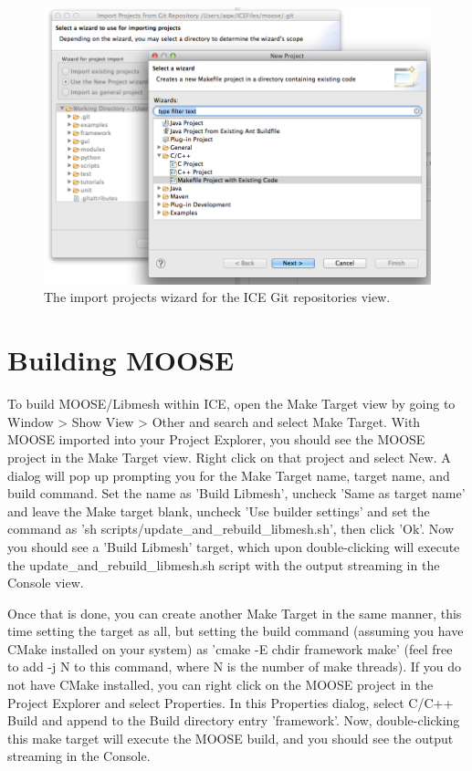 \begin{figure}[htbp]
\centering
\includegraphics[width=\textwidth]{figures/import_git_proj.png}
\caption{The import projects wizard for the ICE Git repositories view. }
\end{figure}

\section{Building MOOSE}\label{building-moose}

To build MOOSE/Libmesh within ICE, open the Make Target view by going to
Window \textgreater{} Show View \textgreater{} Other and search and
select Make Target. With MOOSE imported into your Project Explorer, you
should see the MOOSE project in the Make Target view. Right click on
that project and select New. A dialog will pop up prompting you for the
Make Target name, target name, and build command. Set the name as 'Build
Libmesh', uncheck 'Same as target name' and leave the Make target blank,
uncheck 'Use builder settings' and set the command as 'sh
scripts/update\_and\_rebuild\_libmesh.sh', then click 'Ok'. Now you
should see a 'Build Libmesh' target, which upon double-clicking will
execute the update\_and\_rebuild\_libmesh.sh script with the output
streaming in the Console view.

Once that is done, you can create another Make Target in the same
manner, this time setting the target as all, but setting the build
command (assuming you have CMake installed on your system) as 'cmake -E
chdir framework make' (feel free to add -j N to this command, where N is
the number of make threads). If you do not have CMake installed, you can
right click on the MOOSE project in the Project Explorer and select
Properties. In this Properties dialog, select C/C++ Build and append to
the Build directory entry 'framework'. Now, double-clicking this make
target will execute the MOOSE build, and you should see the output
streaming in the Console.

